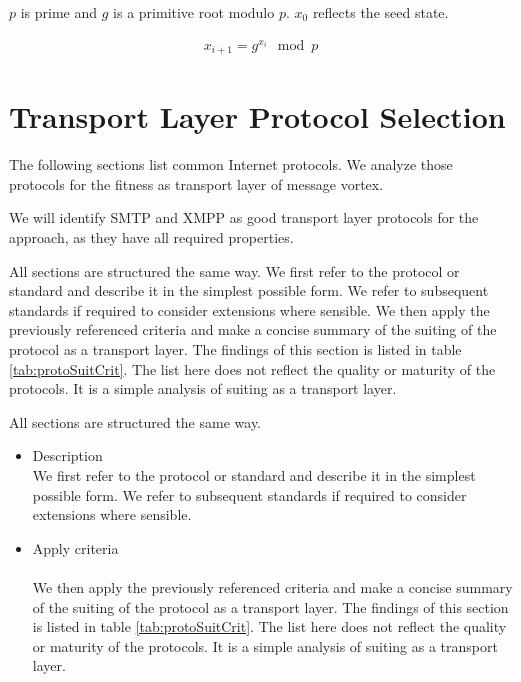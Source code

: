 $p$ is prime and $g$ is a primitive root modulo $p$. $x_0$ reflects the seed state.

\begin{eqnarray}
x_{i+1}=g^{x_i}\mod p
\end{eqnarray}


\section{Transport Layer Protocol Selection\label{sec:transportProtocols}}
The following sections list common Internet protocols. We analyze those protocols for the fitness as transport layer of message vortex. 

We will identify SMTP and XMPP as good transport layer protocols for the \MessageVortex approach, as they have all required properties.

All sections are structured the same way. We first refer to the protocol or standard and describe it in the simplest possible form. We refer to subsequent standards if required to consider extensions where sensible. We then apply the previously referenced criteria and make a concise summary of the suiting of the protocol as a transport layer. The findings of this section is listed in table \ref{tab:protoSuitCrit}. The list here does not reflect the quality or maturity of the protocols. It is a simple analysis of suiting as a transport layer.

All sections are structured the same way. 
\begin{itemize}
	\item Description\\
	We first refer to the protocol or standard and describe it in the simplest possible form. We refer to subsequent standards if required to consider extensions where sensible.
	\item Apply criteria\\\\
	We then apply the previously referenced criteria and make a concise summary of the suiting of the protocol as a transport layer. The findings of this section is listed in table \ref{tab:protoSuitCrit}. The list here does not reflect the quality or maturity of the protocols. It is a simple analysis of suiting as a transport layer.
\end{itemize} 

